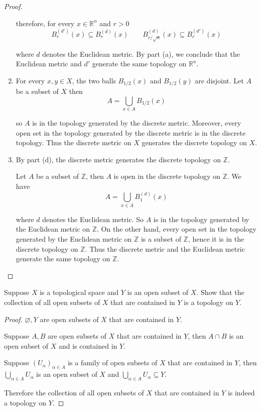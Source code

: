 \begin{proof}
\begin{enumerate}[label={(\alph*)}]
		      therefore, for every $x\in \mathbb{R}^{n}$ and $r > 0$
		      \[
			      B^{(d')}_{r}(x) \subseteq B^{(d)}_{r}(x) \qquad B^{(d)}_{r/\sqrt{n}}(x) \subseteq B^{(d')}_{r}(x)
		      \]

		      where $d$ denotes the Euclidean metric. By part (a), we conclude that the Euclidean metric and $d'$ generate the same topology on $\mathbb{R}^{n}$.
		\item For every $x, y\in X$, the two balls $B_{1/2}(x)$ and $B_{1/2}(y)$ are disjoint. Let $A$ be a subset of $X$ then
		      \[
			      A = \bigcup_{x\in A}B_{1/2}(x)
		      \]

		      so $A$ is in the topology generated by the discrete metric. Moreover, every open set in the topology generated by the discrete metric is in the discrete topology. Thus the discrete metric on $X$ generates the discrete topology on $X$.
		\item By part (d), the discrete metric generates the discrete topology on $\mathbb{Z}$.

		      Let $A$ be a subset of $\mathbb{Z}$, then $A$ is open in the discrete topology on $\mathbb{Z}$. We have
		      \[
			      A = \bigcup_{x\in A}B^{(d)}_{1}(x)
		      \]

		      where $d$ denotes the Euclidean metric. So $A$ is in the topology generated by the Euclidean metric on $\mathbb{Z}$. On the other hand, every open set in the topology generated by the Euclidean metric on $\mathbb{Z}$ is a subset of $\mathbb{Z}$, hence it is in the discrete topology on $\mathbb{Z}$. Thus the discrete metric and the Euclidean metric generate the same topology on $\mathbb{Z}$.
	\end{enumerate}
\end{proof}

\begin{exercise}{2.5}
	Suppose $X$ is a topological space and $Y$ is an open subset of $X$. Show that the collection of all open subsets of $X$ that are contained in $Y$ is a topology on $Y$.
\end{exercise}

\begin{proof}
	$\varnothing, Y$ are open subsets of $X$ that are contained in $Y$.

	Suppose $A, B$ are open subsets of $X$ that are contained in $Y$, then $A\cap B$ is an open subset of $X$ and is contained in $Y$.

	Suppose ${(U_{\alpha})}_{\alpha\in A}$ is a family of open subsets of $X$ that are contained in $Y$, then $\bigcup_{\alpha\in A}U_{\alpha}$ is an open subset of $X$ and $\bigcup_{\alpha\in A}U_{\alpha}\subseteq Y$.

	Therefore the collection of all open subsets of $X$ that are contained in $Y$ is indeed a topology on $Y$.
\end{proof}

